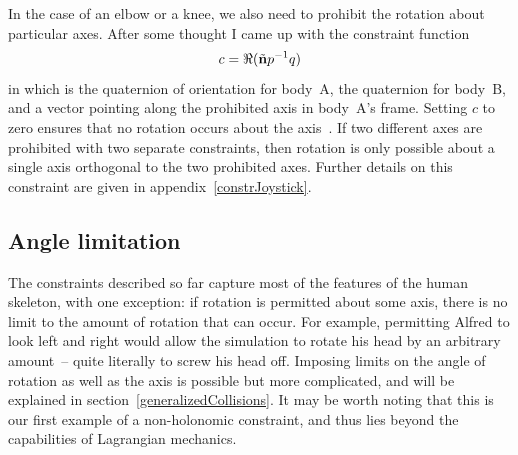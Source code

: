 In the case of an elbow or a knee, we also need to prohibit the rotation about particular axes.
After some thought I came up with the constraint function
\begin{equation}\label{rotationConstraintEqn}
c = \Re(\tilde{\ve{n}}\q{p}^{-1}\q{q})
\end{equation}
in which  is the quaternion of orientation for body~A,  the quaternion for body~B, and
 a vector pointing along the prohibited axis in body~A's frame. Setting $c$ to zero ensures
that no rotation occurs about the axis~. If two different axes are prohibited with two
separate constraints, then rotation is only possible about a single axis orthogonal to the two
prohibited axes. Further details on this constraint are given in appendix~\ref{constrJoystick}.

\subsection{Angle limitation\label{angleLimitation}}

The constraints described so far capture most of the features of the human skeleton, with one
exception: if rotation is permitted about some axis, there is no limit to the amount of rotation
that can occur. For example, permitting Alfred to look left and right would allow the simulation
to rotate his head by an arbitrary amount~-- quite literally to screw his head off. Imposing
limits on the angle of rotation as well as the axis is possible but more complicated, and will
be explained in section~\ref{generalizedCollisions}. It may be worth noting that this is our
first example of a non-holonomic constraint, and thus lies beyond the capabilities of Lagrangian
mechanics.

